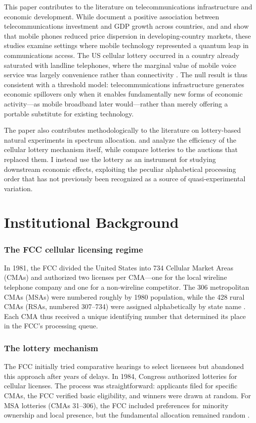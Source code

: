 \documentclass[12pt]{article}
\begin{document}
This paper contributes to the literature on telecommunications infrastructure and economic development. While \citet{roller2001} document a positive association between telecommunications investment and GDP growth across countries, and \citet{jensen2007} and \citet{aker2010} show that mobile phones reduced price dispersion in developing-country markets, these studies examine settings where mobile technology represented a quantum leap in communications access. The US cellular lottery occurred in a country already saturated with landline telephones, where the marginal value of mobile voice service was largely convenience rather than connectivity \citep{hausman1997}. The null result is thus consistent with a threshold model: telecommunications infrastructure generates economic spillovers only when it enables fundamentally new forms of economic activity---as mobile broadband later would---rather than merely offering a portable substitute for existing technology.

The paper also contributes methodologically to the literature on lottery-based natural experiments in spectrum allocation. \citet{hazlett1998} and \citet{kwerel2000} analyze the efficiency of the cellular lottery mechanism itself, while \citet{cramton1997} compare lotteries to the auctions that replaced them. I instead use the lottery as an instrument for studying downstream economic effects, exploiting the peculiar alphabetical processing order that has not previously been recognized as a source of quasi-experimental variation.

\section{Institutional Background}

\subsubsection*{The FCC cellular licensing regime} In 1981, the FCC divided the United States into 734 Cellular Market Areas (CMAs) and authorized two licenses per CMA---one for the local wireline telephone company and one for a non-wireline competitor. The 306 metropolitan CMAs (MSAs) were numbered roughly by 1980 population, while the 428 rural CMAs (RSAs, numbered 307--734) were assigned alphabetically by state name \citep{hazlett1998}. Each CMA thus received a unique identifying number that determined its place in the FCC's processing queue.

\subsubsection*{The lottery mechanism} The FCC initially tried comparative hearings to select licensees but abandoned this approach after years of delays. In 1984, Congress authorized lotteries for cellular licenses. The process was straightforward: applicants filed for specific CMAs, the FCC verified basic eligibility, and winners were drawn at random. For MSA lotteries (CMAs 31--306), the FCC included preferences for minority ownership and local presence, but the fundamental allocation remained random \citep{mcmillan1994}.
\end{document}
